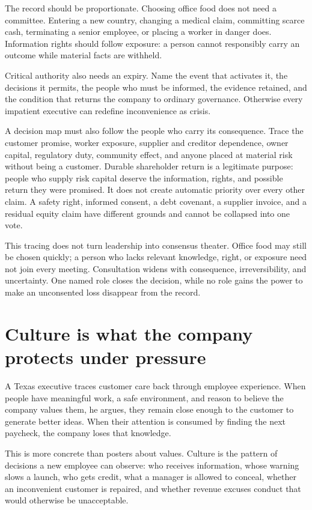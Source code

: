 The record should be proportionate. Choosing office food does not need a
committee. Entering a new country, changing a medical claim, committing scarce
cash, terminating a senior employee, or placing a worker in danger does.
Information rights should follow exposure: a person cannot responsibly carry
an outcome while material facts are withheld.

Critical authority also needs an expiry. Name the event that activates it, the
decisions it permits, the people who must be informed, the evidence retained,
and the condition that returns the company to ordinary governance. Otherwise
every impatient executive can redefine inconvenience as crisis.

A decision map must also follow the people who carry its consequence. Trace
the customer promise, worker exposure, supplier and creditor dependence,
owner capital, regulatory duty, community effect, and anyone placed at
material risk without being a customer. Durable shareholder return is a
legitimate purpose: people who supply risk capital deserve the information,
rights, and possible return they were promised. It does not create automatic
priority over every other claim. A safety right, informed consent, a debt
covenant, a supplier invoice, and a residual equity claim have different
grounds and cannot be collapsed into one vote.

This tracing does not turn leadership into consensus theater. Office food may
still be chosen quickly; a person who lacks relevant knowledge, right, or
exposure need not join every meeting. Consultation widens with consequence,
irreversibility, and uncertainty. One named role closes the decision, while no
role gains the power to make an unconsented loss disappear from the record.

\section{Culture is what the company protects under pressure}

A Texas executive traces customer care back through employee experience. When
people have meaningful work, a safe environment, and reason to believe the
company values them, he argues, they remain close enough to the customer to
generate better ideas. When their attention is consumed by finding the next
paycheck, the company loses that knowledge.

This is more concrete than posters about values. Culture is the pattern of
decisions a new employee can observe: who receives information, whose warning
slows a launch, who gets credit, what a manager is allowed to conceal, whether
an inconvenient customer is repaired, and whether revenue excuses conduct
that would otherwise be unacceptable.

